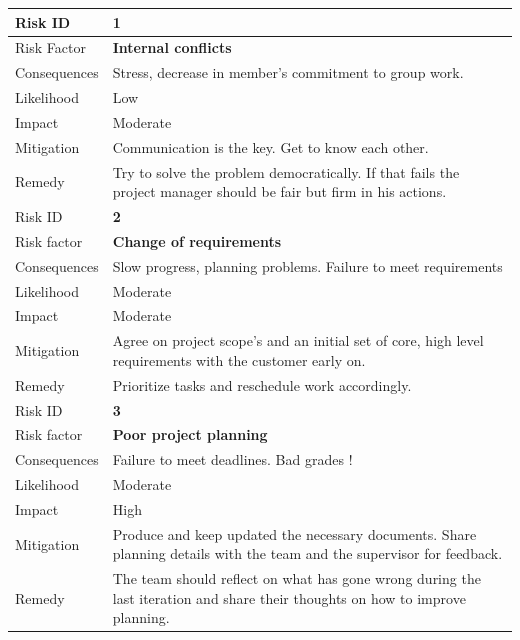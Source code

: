\begin{table}[H]
\begin{tabular}{ | l | p{11.5cm} | }

  \hline
  Risk ID & \textbf{1} \\
  \hline\noalign{\smallskip}\noalign{\smallskip}\hline
  Risk Factor   & \textbf{Internal conflicts} \\
  Consequences  & Stress, decrease in member’s commitment to group work.\\
  Likelihood    & Low \\
  Impact        & Moderate \\
  Mitigation    & Communication is the key. Get to know each other. \\
  Remedy        & Try to solve the problem democratically. \newline
                If that fails the project manager should be fair but firm in his actions. \\
  \hline
  
  \hline\noalign{\smallskip}\noalign{\smallskip}\hline
  Risk ID & \textbf{2} \\
  \hline\noalign{\smallskip}\noalign{\smallskip}\hline
  Risk factor   & \textbf{Change of requirements} \\
  Consequences  & Slow progress, planning problems. Failure to meet requirements \\
  Likelihood    & Moderate \\
  Impact        & Moderate \\
  Mitigation    & Agree on project scope’s and an initial set of core, high level requirements with the customer early on. \\
  Remedy        & Prioritize tasks and reschedule work accordingly. \\
  \hline

  \hline\noalign{\smallskip}\noalign{\smallskip}\hline
  Risk ID & \textbf{3} \\
  \hline\noalign{\smallskip}\noalign{\smallskip}\hline
  Risk factor   & \textbf{Poor project planning} \\
  Consequences  & Failure to meet deadlines. Bad grades !\\
  Likelihood    & Moderate \\
  Impact        & High \\
  Mitigation    & Produce and keep updated the necessary documents.
                Share planning details with the team and the supervisor for feedback. \\
  Remedy        & The team should reflect on what has gone wrong during the last iteration and
                share their thoughts on how to improve planning. \\
  \hline


\end{tabular}
\end{table}
